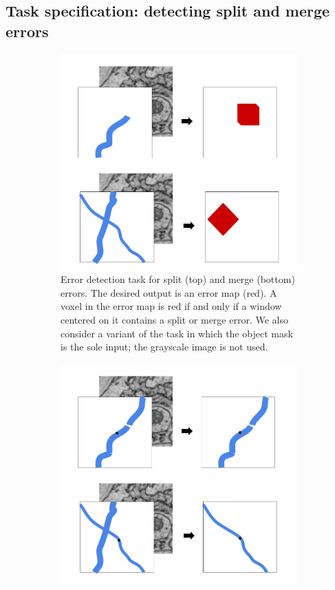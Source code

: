\documentclass{article}
\begin{document}
\subsection{Task specification: detecting split and merge errors}
\label{sec:detection_spec}
\begin{figure}[t!]
	\begin{center}
	\begin{subfigure}[t]{0.45\textwidth}
		\includegraphics[width=1.0\linewidth]{detection_task.jpg}
		\caption{Error detection task for split (top) and merge (bottom) errors. The desired output is an error map (red). A voxel in the error map is red if and only if a window centered on it contains a split or merge error. We also consider a variant of the task in which the object mask is the sole input; the grayscale image is not used.}
		\label{fig:error_detection_cartoon}
	\end{subfigure}
\hfill
	\begin{subfigure}[t]{0.45\textwidth}
	\includegraphics[width=1.0\linewidth]{correction_task.jpg}

\end{subfigure}
\end{center}
\end{figure}
\end{document}

